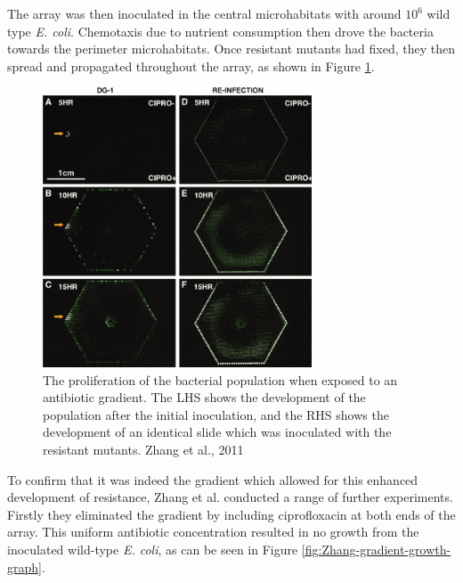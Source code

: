 \documentclass[a4paper,12pt]{article}
\begin{document}
The array was then inoculated in the central microhabitats with around $10^6$ wild type \textit{E. coli}.  Chemotaxis due to nutrient consumption 
then drove the bacteria towards the perimeter microhabitats.  Once resistant mutants had fixed, they then spread and propagated throughout the array,
as shown in Figure \ref{fig:Zhang-gradient-apparatus}.

\begin{figure}[h]
 \centering
 \includegraphics[width=8cm]{Zhang-microhab-gradient-cropped}
 \caption{The proliferation of the bacterial population when exposed to an antibiotic gradient.  The LHS shows the development
 of the population after the initial inoculation, and the RHS shows the development of an identical slide which was 
 inoculated with the resistant mutants. Zhang et al., 2011}
 \label{fig:Zhang-gradient-apparatus}
\end{figure}

To confirm that it was indeed the gradient which allowed for this enhanced development of resistance, Zhang et al. conducted a range of further experiments.
Firstly they eliminated the gradient by including ciprofloxacin at both ends of the array.  This uniform antibiotic concentration resulted in no growth
from the inoculated wild-type \textit{E. coli}, as can be seen in Figure \ref{fig:Zhang-gradient-growth-graph}.
\end{document}
